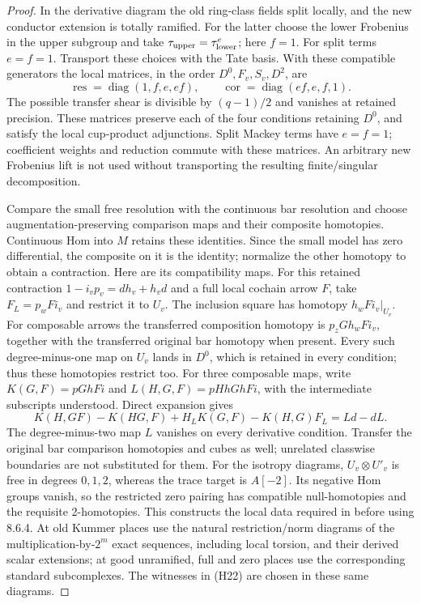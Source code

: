 \documentclass[11pt]{article}
\theoremstyle{definition}
\theoremstyle{remark}
\begin{document}
\begin{proof}
In the derivative diagram the old ring-class fields split
locally, and the new conductor extension is totally ramified.
For the latter choose the lower Frobenius in the upper subgroup
and take $\tau_{\rm upper}=\tau_{\rm lower}^e$; here $f=1$.
For split terms $e=f=1$. Transport these choices with the Tate
basis. With these compatible generators the local matrices, in the order
$D^0,F_v,S_v,D^2$, are
\[
 \operatorname{res}=\operatorname{diag}(1,f,e,ef),\qquad
 \operatorname{cor}=\operatorname{diag}(ef,e,f,1).
\]
The possible transfer shear is divisible by $(q-1)/2$ and
vanishes at retained precision. These matrices preserve each
of the four conditions retaining $D^0$, and satisfy the local
cup-product adjunctions. Split Mackey terms have $e=f=1$;
coefficient weights and reduction commute with these matrices.
An arbitrary new Frobenius lift is not used without transporting
the resulting finite/singular decomposition.

Compare the small free resolution with the continuous bar
resolution and choose augmentation-preserving comparison maps
and their composite homotopies. Continuous Hom into $M$ retains
these identities. Since the small model has zero differential,
the composite on it is the identity; normalize the other homotopy
to obtain a contraction. Here are its compatibility maps.
For this retained contraction $1-i_vp_v=dh_v+h_vd$ and a full
local cochain arrow $F$, take $F_L=p_wFi_v$ and restrict it to
$U_v$. The inclusion square has homotopy $h_wFi_v|_{U_v}$.
For composable arrows the transferred composition homotopy is
$p_zGh_wFi_v$, together with the transferred original bar
homotopy when present. Every such degree-minus-one map on
$U_v$ lands in $D^0$, which is retained in every condition;
thus these homotopies restrict too. For three composable maps,
write $K(G,F)=pGhFi$ and $L(H,G,F)=pHhGhFi$, with the
intermediate subscripts understood. Direct expansion gives
\[
 K(H,GF)-K(HG,F)+H_LK(G,F)-K(H,G)F_L=Ld-dL.
\]
The degree-minus-two map $L$ vanishes on every derivative
condition. Transfer the original bar comparison homotopies and
cubes as well; unrelated classwise boundaries are not substituted
for them. For the isotropy diagrams, $U_v\otimes U'_v$ is
free in degrees $0,1,2$, whereas the trace target is $A[-2]$.
Its negative Hom groups vanish, so the restricted zero pairing
has compatible null-homotopies and the requisite 2-homotopies.
This constructs the local data required in
\cite[8.6.2.1--8.6.2.4]{nekovar} before using 8.6.4.
At old Kummer places use the natural restriction/norm diagrams
of the multiplication-by-$2^m$ exact sequences, including
local torsion, and their derived scalar extensions; at good
unramified, full and zero places use the corresponding standard
subcomplexes. The witnesses in (H22) are chosen in these same
diagrams.


\end{proof}
\end{document}
